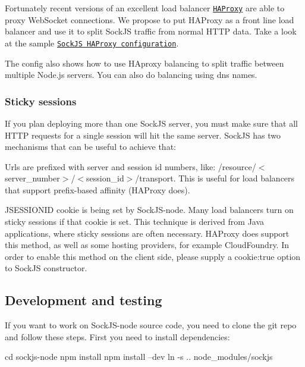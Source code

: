 Fortunately recent versions of an excellent load balancer \href{http://haproxy.1wt.eu/}{\tt H\+A\+Proxy} are able to proxy Web\+Socket connections. We propose to put H\+A\+Proxy as a front line load balancer and use it to split Sock\+JS traffic from normal H\+T\+TP data. Take a look at the sample \href{https://github.com/sockjs/sockjs-node/blob/master/examples/haproxy.cfg}{\tt Sock\+JS H\+A\+Proxy configuration}.

The config also shows how to use H\+Aproxy balancing to split traffic between multiple Node.\+js servers. You can also do balancing using dns names.

\subsubsection*{Sticky sessions}

If you plan deploying more than one Sock\+JS server, you must make sure that all H\+T\+TP requests for a single session will hit the same server. Sock\+JS has two mechanisms that can be useful to achieve that\+:


\begin{DoxyItemize}
\item Urls are prefixed with server and session id numbers, like\+: {\ttfamily /resource/$<$server\+\_\+number$>$/$<$session\+\_\+id$>$/transport}. This is useful for load balancers that support prefix-\/based affinity (H\+A\+Proxy does).
\item {\ttfamily J\+S\+E\+S\+S\+I\+O\+N\+ID} cookie is being set by Sock\+J\+S-\/node. Many load balancers turn on sticky sessions if that cookie is set. This technique is derived from Java applications, where sticky sessions are often necessary. H\+A\+Proxy does support this method, as well as some hosting providers, for example Cloud\+Foundry. In order to enable this method on the client side, please supply a {\ttfamily cookie\+:true} option to Sock\+JS constructor.
\end{DoxyItemize}

\subsection*{Development and testing }

If you want to work on Sock\+J\+S-\/node source code, you need to clone the git repo and follow these steps. First you need to install dependencies\+: \begin{DoxyVerb}cd sockjs-node
npm install
npm install --dev
ln -s .. node_modules/sockjs
\end{DoxyVerb}


